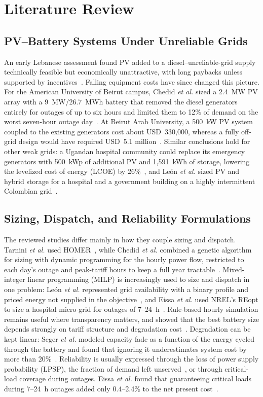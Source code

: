 \section{Literature Review}

\subsection{PV--Battery Systems Under Unreliable Grids}
An early Lebanese assessment found PV added to a diesel--unreliable-grid supply technically feasible but economically unattractive, with long paybacks unless supported by incentives~\cite{chedid2015}. Falling equipment costs have since changed this picture. For the American University of Beirut campus, Chedid \textit{et al.} sized a 2.4~MW PV array with a 9~MW/26.7~MWh battery that removed the diesel generators entirely for outages of up to six hours and limited them to 12\% of demand on the worst seven-hour outage day~\cite{chedid2020}. At Beirut Arab University, a 500~kW PV system coupled to the existing generators cost about USD~330,000, whereas a fully off-grid design would have required USD~5.1 million~\cite{tarnini2023}. Similar conclusions hold for other weak grids: a Ugandan hospital community could replace its emergency generators with 500~kWp of additional PV and 1,591~kWh of storage, lowering the levelized cost of energy (LCOE) by 26\%~\cite{felice2023}, and Le\'{o}n \textit{et al.} sized PV and hybrid storage for a hospital and a government building on a highly intermittent Colombian grid~\cite{leon2023}.

\subsection{Sizing, Dispatch, and Reliability Formulations}
The reviewed studies differ mainly in how they couple sizing and dispatch. Tarnini \textit{et al.} used HOMER~\cite{tarnini2023}, while Chedid \textit{et al.} combined a genetic algorithm for sizing with dynamic programming for the hourly power flow, restricted to each day's outage and peak-tariff hours to keep a full year tractable~\cite{chedid2020}. Mixed-integer linear programming (MILP) is increasingly used to size and dispatch in one problem: Le\'{o}n \textit{et al.} represented grid availability with a binary profile and priced energy not supplied in the objective~\cite{leon2023}, and Eissa \textit{et al.} used NREL's REopt to size a hospital micro-grid for outages of 7--24~h~\cite{eissa2026}. Rule-based hourly simulation remains useful where transparency matters, and showed that the best battery size depends strongly on tariff structure and degradation cost~\cite{gunawardana2014}. Degradation can be kept linear: Seger \textit{et al.} modeled capacity fade as a function of the energy cycled through the battery and found that ignoring it underestimates system cost by more than 20\%~\cite{seger2023}. Reliability is usually expressed through the loss of power supply probability (LPSP), the fraction of demand left unserved~\cite{yang2008}, or through critical-load coverage during outages. Eissa \textit{et al.} found that guaranteeing critical loads during 7--24~h outages added only 0.4--2.4\% to the net present cost~\cite{eissa2026}.

